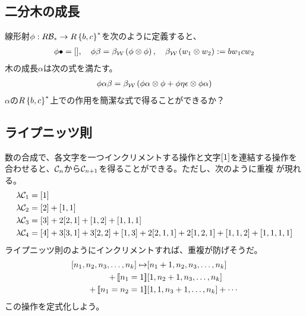 {\subsection{二分木の成長}\label{s2:二分木の成長} %
	線形射$\phi:R{\mathcal{B}}_*\to R\mathinner{\{{b,c}\}}^*$を次のように定義すると、
	\begin{equation*}\begin{split}
		\phi\bullet = {\mathinner{\left[{}\right]}},\quad \phi\beta = \beta_{\mathcal{W}}\mathinner{({\phi\otimes\phi})}
		,\quad \beta_{\mathcal{W}}\mathinner{({w_1\otimes w_2})} := bw_1cw_2
	\end{split}\end{equation*}
	木の成長$\alpha$は次の式を満たす。
	\begin{equation*}\begin{split}
		\phi\alpha\beta = \beta_{\mathcal{W}}\mathinner{({\phi\alpha\otimes\phi 
		+ \phi\eta\epsilon\otimes\phi\alpha})}
	\end{split}\end{equation*}
	$\alpha$の$R\mathinner{\{{b,c}\}}^*$上での作用を簡潔な式で得ることができるか？
\subsection{ライプニッツ則}\label{s2:ライプニッツ則} %
	数の合成で、各文字を一つインクリメントする操作と文字${\mathinner{\left[{1}\right]}}$を連結する操作を
	合わせると、${\mathcal{C}}_n$から${\mathcal{C}}_{n+1}$を得ることができる。ただし、次のように重複
	が現れる。
	\begin{equation*}\begin{split}
		\lambda{\mathcal{C}}_1 &= {\mathinner{\left[{1}\right]}} \\
		\lambda{\mathcal{C}}_2 &= {\mathinner{\left[{2}\right]}} + {\mathinner{\left[{1, 1}\right]}} \\
		\lambda{\mathcal{C}}_3 &= {\mathinner{\left[{3}\right]}} + 2{\mathinner{\left[{2, 1}\right]}} + {\mathinner{\left[{1,2}\right]}} + {\mathinner{\left[{1,1,1}\right]}} \\
		\lambda{\mathcal{C}}_4 &= {\mathinner{\left[{4}\right]}} + 3{\mathinner{\left[{3, 1}\right]}} + 3{\mathinner{\left[{2,2}\right]}} + {\mathinner{\left[{1,3}\right]}} 
			+ 2{\mathinner{\left[{2,1,1}\right]}} + 2{\mathinner{\left[{1,2,1}\right]}} + {\mathinner{\left[{1,1,2}\right]}} + {\mathinner{\left[{1,1,1,1}\right]}} \\
	\end{split}\end{equation*}
	ライプニッツ則のようにインクリメントすれば、重複が防げそうだ。
	\begin{equation*}\begin{split}
		{\mathinner{\left[{n_1,n_2,n_3,\dots,n_k}\right]}} \mapsto &{\mathinner{\left[{n_1+1,n_2,n_3,\dots,n_k}\right]}} \\
		+ \mathinner{[\![n_1=1]\!]} &{\mathinner{\left[{1,n_2+1,n_3,\dots,n_k}\right]}} \\
		+ \mathinner{[\![n_1=n_2=1]\!]} &{\mathinner{\left[{1,1,n_3+1,\dots,n_k}\right]}}
		+ \cdots
	\end{split}\end{equation*}
	この操作を定式化しよう。

}
